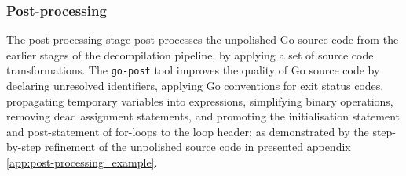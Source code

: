 
\subsubsection{Post-processing}
\label{sec:design_post-processing}

The post-processing stage post-processes the unpolished Go source code from the earlier stages of the decompilation pipeline, by applying a set of source code transformations. The \texttt{go-post} tool improves the quality of Go source code by declaring unresolved identifiers, applying Go conventions for exit status codes, propagating temporary variables into expressions, simplifying binary operations, removing dead assignment statements, and promoting the initialisation statement and post-statement of for-loops to the loop header; as demonstrated by the step-by-step refinement of the unpolished source code in presented appendix \ref{app:post-processing_example}.
